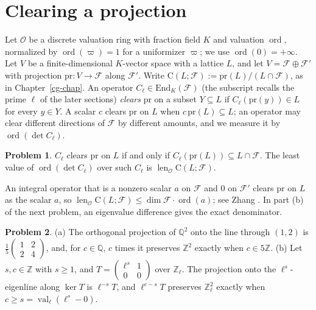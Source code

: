\documentclass[reqno]{amsart}
\newcounter{chap}
\theoremstyle{definition}
\newtheorem{problem}{Problem}[section]
\newcommand{\Z}{\mathbb{Z}}
\newcommand{\Q}{\mathbb{Q}}
\newcommand{\Oc}{\mathcal{O}}
\newcommand{\Cg}{\mathrm{C}}
\newcommand{\pr}{\mathrm{pr}}
\newcommand{\len}{\operatorname{len}}
\newcommand{\val}{\operatorname{val}}
\newcommand{\ord}{\operatorname{ord}}
\begin{document}
\section{Clearing a projection}\label{sec:clearing}

Let \(\Oc\) be a discrete valuation ring with fraction field \(K\) and valuation \(\ord\), normalized by \(\ord(\varpi) = 1\) for a uniformizer \(\varpi\); we use \(\ord(0) = +\infty\).  Let \(V\) be a finite-dimensional \(K\)-vector space with a lattice \(L\), and let \(V = \mathcal F \oplus \mathcal F'\) with projection \(\pr \colon V \to \mathcal F\) along \(\mathcal F'\).  Write \(\Cg(L; \mathcal F) := \pr(L)/(L \cap \mathcal F)\), as in Chapter~\ref{cg-chap}.  An operator \(C_\ell \in \mathrm{End}_K(\mathcal F)\) (the subscript recalls the prime \(\ell\) of the later sections) \emph{clears} \(\pr\) on a subset \(Y \subseteq L\) if \(C_\ell(\pr(y)) \in L\) for every \(y \in Y\).  A scalar \(c\) clears \(\pr\) on \(L\) when \(c\,\pr(L) \subseteq L\); an operator may clear different directions of \(\mathcal F\) by different amounts, and we measure it by \(\ord(\det C_\ell)\).

\begin{problem}\label{pr:clear-det}
\(C_\ell\) clears \(\pr\) on \(L\) if and only if \(C_\ell(\pr(L)) \subseteq L \cap \mathcal F\).  The least value of \(\ord(\det C_\ell)\) over such \(C_\ell\) is \(\len_{\Oc} \Cg(L; \mathcal F)\).
\end{problem}

An integral operator that is a nonzero scalar \(a\) on \(\mathcal F\) and \(0\) on \(\mathcal F'\) clears \(\pr\) on \(L\) as the scalar \(a\), so \(\len_{\Oc}\Cg(L; \mathcal F) \le \dim \mathcal F \cdot \ord(a)\); see Zhang \cite[Lemma~5.1]{Zh}.  In part (b) of the next problem, an eigenvalue difference gives the exact denominator.

\begin{problem}\label{pr:proj-cost}
(a) The orthogonal projection of \(\Q^2\) onto the line through \((1,2)\) is \(\frac15\left(\begin{smallmatrix}1&2\\2&4\end{smallmatrix}\right)\), and, for \(c \in \Q\), \(c\) times it preserves \(\Z^2\) exactly when \(c \in 5\Z\).  (b) Let \(s, c \in \Z\) with \(s \ge 1\), and \(T = \left(\begin{smallmatrix}\ell^s&1\\0&0\end{smallmatrix}\right)\) over \(\Z_\ell\).  The projection onto the \(\ell^s\)-eigenline along \(\ker T\) is \(\ell^{-s}T\), and \(\ell^{c-s}T\) preserves \(\Z_\ell^2\) exactly when \(c \ge s = \val_\ell(\ell^s - 0)\).
\end{problem}
\end{document}
